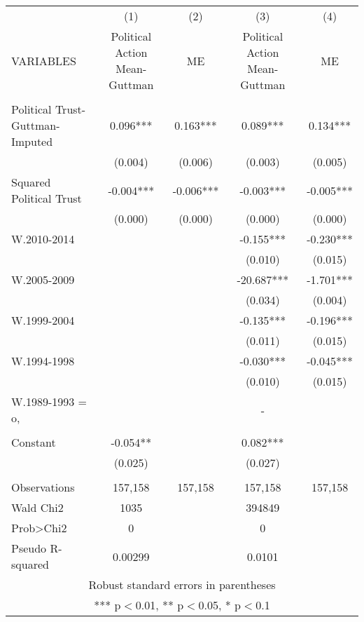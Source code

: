 \documentclass[]{article}
\begin{document}
\begin{tabular}{lcccc} \hline
 & (1) & (2) & (3) & (4) \\
VARIABLES & Political Action Mean-Guttman & ME & Political Action Mean-Guttman & ME \\ \hline
 &  &  &  &  \\
Political Trust-Guttman-Imputed & 0.096*** & 0.163*** & 0.089*** & 0.134*** \\
 & (0.004) & (0.006) & (0.003) & (0.005) \\
Squared Political Trust & -0.004*** & -0.006*** & -0.003*** & -0.005*** \\
 & (0.000) & (0.000) & (0.000) & (0.000) \\
W.2010-2014 &  &  & -0.155*** & -0.230*** \\
 &  &  & (0.010) & (0.015) \\
W.2005-2009 &  &  & -20.687*** & -1.701*** \\
 &  &  & (0.034) & (0.004) \\
W.1999-2004 &  &  & -0.135*** & -0.196*** \\
 &  &  & (0.011) & (0.015) \\
W.1994-1998 &  &  & -0.030*** & -0.045*** \\
 &  &  & (0.010) & (0.015) \\
W.1989-1993 = o, &  &  & - &  \\
 &  &  &  &  \\
Constant & -0.054** &  & 0.082*** &  \\
 & (0.025) &  & (0.027) &  \\
 &  &  &  &  \\
Observations & 157,158 & 157,158 & 157,158 & 157,158 \\
Wald Chi2 & 1035 &  & 394849 &  \\
Prob>Chi2 & 0 &  & 0 &  \\
 Pseudo R-squared & 0.00299 &  & 0.0101 &  \\ \hline
\multicolumn{5}{c}{ Robust standard errors in parentheses} \\
\multicolumn{5}{c}{ *** p$<$0.01, ** p$<$0.05, * p$<$0.1} \\
\end{tabular}
\end{document}
